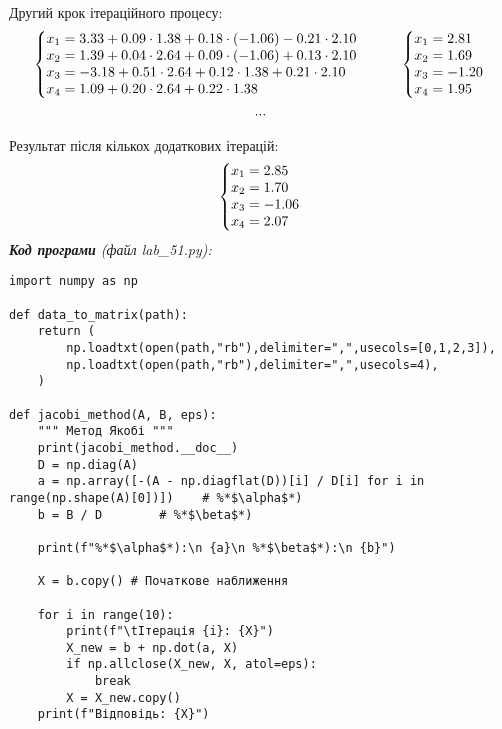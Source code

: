 \documentclass{article}
\newcommand\lab{5}
\begin{document}
\begin{large}
		Другий крок ітераційного процесу:
		\begin{gather}
			\left\{\begin{array}{@{}l@{}}
				x_1=3.33+0.09\cdot1.38+0.18\cdot(-1.06)-0.21\cdot2.10\\\nonumber
				x_2=1.39+0.04\cdot2.64+0.09\cdot(-1.06)+0.13\cdot2.10\\\nonumber
				x_3=-3.18+0.51\cdot2.64+0.12\cdot1.38+0.21\cdot2.10\\\nonumber
				x_4=1.09+0.20\cdot2.64+0.22\cdot1.38\nonumber
			\end{array}\right.\,\hspace{28pt}
				\left\{\begin{array}{@{}l@{}}
				x_1=2.81\\\nonumber
				x_2=1.69\\\nonumber
				x_3=-1.20\\\nonumber
				x_4=1.95\nonumber
			\end{array}\right.\,\\
		...\nonumber
		\end{gather}
	
		Результат після кількох додаткових ітерацій:
		\begin{gather}
			\left\{\begin{array}{@{}l@{}}
				x_1=2.85\\\nonumber
				x_2=1.70\\\nonumber
				x_3=-1.06\\\nonumber
				x_4=2.07\nonumber
			\end{array}\right.\,
		\end{gather}
		\noindent\textit{\textbf{Код програми} (файл lab\_\lab1.py):}
		\begin{lstlisting}
import numpy as np

def data_to_matrix(path):
	return (
		np.loadtxt(open(path,"rb"),delimiter=",",usecols=[0,1,2,3]),
		np.loadtxt(open(path,"rb"),delimiter=",",usecols=4),
	)

def jacobi_method(A, B, eps):
    """ Метод Якобі """
	print(jacobi_method.__doc__)
	D = np.diag(A)
	a = np.array([-(A - np.diagflat(D))[i] / D[i] for i in range(np.shape(A)[0])])    # %*$\alpha$*)
	b = B / D        # %*$\beta$*)
	
	print(f"%*$\alpha$*):\n {a}\n %*$\beta$*):\n {b}")
	
	X = b.copy() # Початкове наближення
	
	for i in range(10):
		print(f"\tІтерація {i}: {X}")
		X_new = b + np.dot(a, X)
		if np.allclose(X_new, X, atol=eps):
			break
		X = X_new.copy()
	print(f"Відповідь: {X}")


\end{lstlisting}
\end{large}
\end{document}
